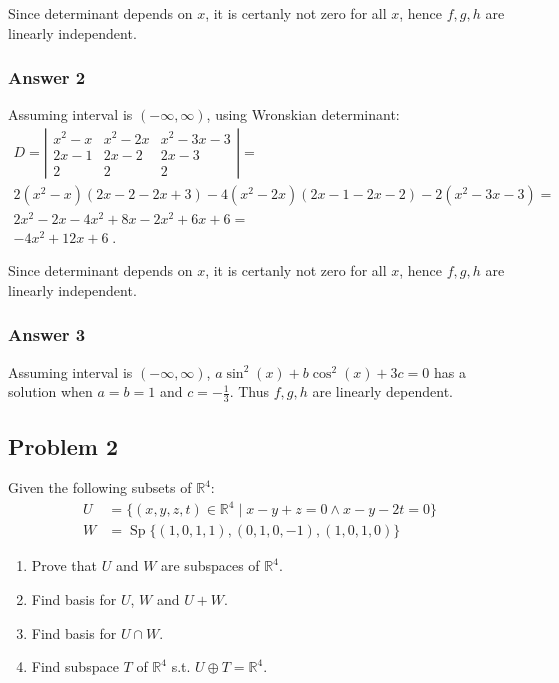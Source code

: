 \documentclass[11pt]{article}
\DeclareMathOperator{\Sp}{Sp}
\begin{document}
Since determinant depends on $x$, it is certanly not zero for all $x$, hence
$f, g, h$ are linearly independent.

\subsubsection{Answer 2}
\label{sec-1-1-2}
Assuming interval is $(-\infty, \infty)$, using Wronskian determinant:
\begin{align*}
  D = \left|
  \begin{array}{lll}
    x^2 - x & x^2 - 2x & x^2 - 3x - 3 \\
    2x - 1  & 2x - 2  & 2x - 3 \\
    2       & 2       & 2
  \end{array}
  \right| = \\
  2(x^2 - x)(2x - 2 - 2x + 3) - 4(x^2 - 2x)(2x - 1 - 2x - 2) - 2(x^2 - 3x - 3) = \\
  2x^2 - 2x - 4x^2 + 8x - 2x^2 + 6x + 6 = \\
  -4x^2 + 12x + 6\;.
\end{align*}

Since determinant depends on $x$, it is certanly not zero for all $x$, hence
$f, g, h$ are linearly independent.

\subsubsection{Answer 3}
\label{sec-1-1-3}
Assuming interval is $(-\infty, \infty)$, $a\sin^2(x) + b\cos^2(x) + 3c = 0$
has a solution when $a = b = 1$ and $c = -\frac{1}{3}$.  Thus $f, g, h$ are
linearly dependent.

\subsection{Problem 2}
\label{sec-1-2}
Given the following subsets of $\mathbb{R}^4$:
\begin{align*}
  U &= \{(x, y, z, t) \in \mathbb{R}^4 \;|\; x - y + z = 0 \land x - y - 2t = 0\} \\
  W &= \Sp\{(1,0,1,1), (0,1,0,-1), (1,0,1,0)\}
\end{align*}


\begin{enumerate}
\item Prove that $U$ and $W$ are subspaces of $\mathbb{R}^4$.
\item Find basis for $U$, $W$ and $U+W$.
\item Find basis for $U \cap W$.
\item Find subspace $T$ of $\mathbb{R}^4$ s.t. $U \oplus T = \mathbb{R}^4$.
\end{enumerate}
\end{document}
